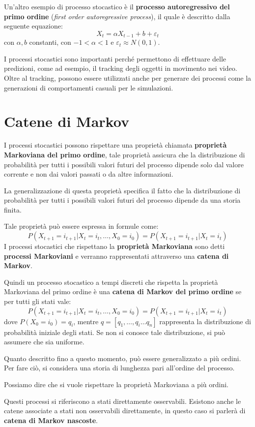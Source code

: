 Un'altro esempio di processo stocastico è il \textbf{processo autoregressivo del
    primo ordine} (\textit{first order autoregressive process}), il quale è descritto
dalla seguente equazione:
\begin{equation*}
    X_t = \alpha X_{t-1} + b + \varepsilon_t
\end{equation*}
con $\alpha,b$ constanti, con $-1<\alpha<1$ e $\varepsilon_t \approx N(0,1)$.

I processi stocastici sono importanti perché permettono di effettuare delle
predizioni, come ad esempio, il tracking degli oggetti in movimento nei video.
Oltre al tracking, possono essere utilizzati anche per generare dei processi come
la generazioni di comportamenti casuali per le simulazioni.
\section{Catene di Markov}
I processi stocastici possono rispettare una proprietà chiamata \textbf{proprietà
    Markoviana del primo ordine}, tale proprietà assicura che la distribuzione di
probabilità per tutti i possibili valori futuri del processo dipende solo dal
valore corrente e non dai valori passati o da altre informazioni.

La generalizzazione di questa proprietà specifica il fatto che la distribuzione
di probabilità per tutti i possibili valori futuri del processo dipende da una
storia finita.

Tale proprietà può essere espressa in formule come:
\begin{equation}
    P(X_{t+1} = i_{t+1 } | X_t =i_t, \dots, X_{0} = i_{0})=P(X_{t+1} = i_{t+1 } | X_t =i_t)
\end{equation}
I processi stocastici che rispettano la \textbf{proprietà Markoviana} sono detti
\textbf{processi Markoviani} e verranno rappresentati attraverso una \textbf{catena di Markov}.

Quindi un processo stocastico a tempi discreti che rispetta la proprietà Markoviana
del primo ordine è una \textbf{catena di Markov del primo ordine} se per tutti
gli stati vale:
\begin{equation*}
    P(X_{t+1} = i_{t+1 } | X_t =i_t, \dots, X_{0} = i_{0}) = P(X_{t+1} = i_{t+1 } | X_t =i_t)
\end{equation*}
dove $P(X_0 = i_0) = q_i$, mentre $q = [q_1, \dots, q_i \dots q_n]$ rappresenta la
distribuzione di probabilità iniziale degli stati. Se non si conosce tale
distribuzione, si può assumere che sia uniforme.
\begin{nota}
    Quanto descritto fino a questo momento, può essere generalizzato a più ordini.
    Per fare ciò, si considera una storia di lunghezza pari all'ordine del processo.

    Possiamo dire che si vuole rispettare la proprietà Markoviana a più ordini.
\end{nota}
Questi processi si riferiscono a stati direttamente osservabili. Esistono anche
le catene associate a stati non osservabili direttamente, in questo caso si
parlerà di \textbf{catena di Markov nascoste}.

